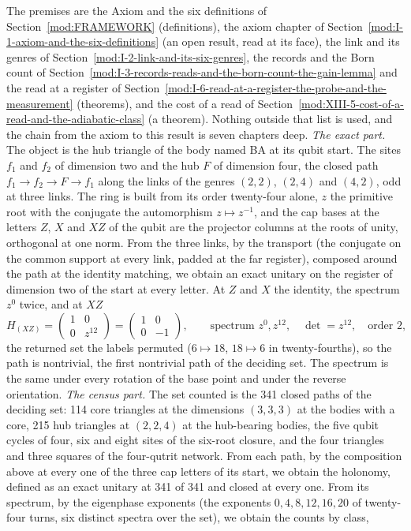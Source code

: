 \begin{chproof}
The premises are the Axiom and the six definitions of Section~\ref{mod:FRAMEWORK} (definitions), the axiom chapter of Section~\ref{mod:I-1-axiom-and-the-six-definitions} (an open result, read at its face), the link and its genres of Section~\ref{mod:I-2-link-and-its-six-genres}, the records and the Born count of Section~\ref{mod:I-3-records-reads-and-the-born-count-the-gain-lemma} and the read at a register of Section~\ref{mod:I-6-read-at-a-register-the-probe-and-the-measurement} (theorems), and the cost of a read of Section~\ref{mod:XIII-5-cost-of-a-read-and-the-adiabatic-class} (a theorem). Nothing outside that list is used, and the chain from the axiom to this result is seven chapters deep.
\emph{The exact part.} The object is the hub triangle of the body named BA at its qubit start. The sites $f_{1}$ and $f_{2}$ of dimension two and the hub $F$ of dimension four, the closed path $f_{1} \to f_{2} \to F \to f_{1}$ along the links of the genres $(2,2)$, $(2,4)$ and $(4,2)$, odd at three links. The ring is built from its order twenty-four alone, $z$ the primitive root with the conjugate the automorphism $z \mapsto z^{-1}$, and the cap bases at the letters $Z$, $X$ and $XZ$ of the qubit are the projector columns at the roots of unity, orthogonal at one norm. From the three links, by the transport (the conjugate on the common support at every link, padded at the far register), composed around the path at the identity matching, we obtain an exact unitary on the register of dimension two of the start at every letter. At $Z$ and $X$ the identity, the spectrum $z^{0}$ twice, and at $XZ$
\begin{equation}
H_{(XZ)} = \begin{pmatrix} 1 & 0 \\ 0 & z^{12} \end{pmatrix} = \begin{pmatrix} 1 & 0 \\ 0 & -1 \end{pmatrix}, \qquad \text{spectrum } z^{0}, z^{12}, \quad \det = z^{12}, \quad \text{order } 2 ,
\end{equation}
the returned set the labels permuted ($6 \mapsto 18$, $18 \mapsto 6$ in twenty-fourths), so the path is nontrivial, the first nontrivial path of the deciding set. The spectrum is the same under every rotation of the base point and under the reverse orientation.
\emph{The census part.} The set counted is the 341 closed paths of the deciding set: 114 core triangles at the dimensions $(3,3,3)$ at the bodies with a core, 215 hub triangles at $(2,2,4)$ at the hub-bearing bodies, the five qubit cycles of four, six and eight sites of the six-root closure, and the four triangles and three squares of the four-qutrit network. From each path, by the composition above at every one of the three cap letters of its start, we obtain the holonomy, defined as an exact unitary at 341 of 341 and closed at every one. From its spectrum, by the eigenphase exponents (the exponents $0, 4, 8, 12, 16, 20$ of twenty-four turns, six distinct spectra over the set), we obtain the counts by class,

\end{chproof}
